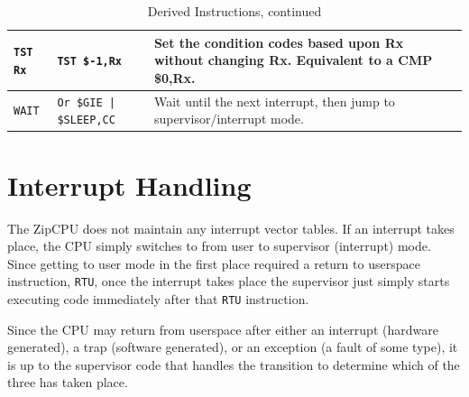 \documentclass{gqtekspec}
\begin{document}
\begin{table}\begin{center}
\begin{tabular}{p{1.0in}p{1.5in}p{3in}}\\\hline
{\tt TST Rx}
	& {\tt TST \$-1,Rx}
	& Set the condition codes based upon Rx without changing Rx.
	Equivalent to a CMP \$0,Rx.\\\hline
{\tt WAIT}
	& {\tt Or \$GIE | \$SLEEP,CC}
	& Wait until the next interrupt, then jump to supervisor/interrupt
	mode.
\end{tabular}
\caption{Derived Instructions, continued}\label{tbl:derived-4}
\end{center}\end{table}

\section{Interrupt Handling}
The ZipCPU does not maintain any interrupt vector tables.  If an interrupt
takes place, the CPU simply switches to from user to supervisor (interrupt)
mode.  Since getting to user mode in the first place required a return to
userspace instruction, {\tt RTU}, once the interrupt takes place the 
supervisor just simply starts executing code immediately after that
{\tt RTU} instruction.

Since the CPU may return from userspace after either an interrupt (hardware
generated), a trap (software generated), or an exception (a fault of some
type), it is up to the supervisor code that handles the transition to
determine which of the three has taken place.

\iffalse
\end{document}
